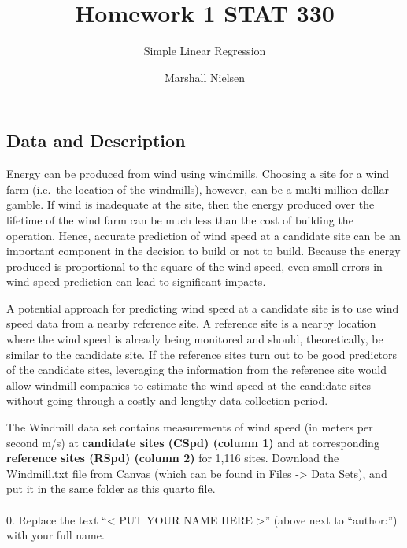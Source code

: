 \documentclass[
  letterpaper,
  DIV=11,
  numbers=noendperiod]{scrartcl}
\title{Homework 1 \textbar{} STAT 330}
\subtitle{Simple Linear Regression}
\author{Marshall Nielsen}
\date{}
\makeatletter
\let\oldparagraph\paragraph
\renewcommand{\paragraph}{
    \@ifstar
      \xxxParagraphStar
      \xxxParagraphNoStar
  }
\newcommand{\xxxParagraphStar}[1]{\oldparagraph*{#1}\mbox{}}
\newcommand{\xxxParagraphNoStar}[1]{\oldparagraph{#1}\mbox{}}
\makeatother
\begin{document}
\maketitle


\subsection{Data and Description}\label{data-and-description}

Energy can be produced from wind using windmills. Choosing a site for a
wind farm (i.e.~the location of the windmills), however, can be a
multi-million dollar gamble. If wind is inadequate at the site, then the
energy produced over the lifetime of the wind farm can be much less than
the cost of building the operation. Hence, accurate prediction of wind
speed at a candidate site can be an important component in the decision
to build or not to build. Because the energy produced is proportional to
the square of the wind speed, even small errors in wind speed prediction
can lead to significant impacts.

A potential approach for predicting wind speed at a candidate site is to
use wind speed data from a nearby reference site. A reference site is a
nearby location where the wind speed is already being monitored and
should, theoretically, be similar to the candidate site. If the
reference sites turn out to be good predictors of the candidate sites,
leveraging the information from the reference site would allow windmill
companies to estimate the wind speed at the candidate sites without
going through a costly and lengthy data collection period.

The Windmill data set contains measurements of wind speed (in meters per
second m/s) at \textbf{candidate sites (CSpd) (column 1)} and at
corresponding \textbf{reference sites (RSpd) (column 2)} for 1,116
sites. Download the Windmill.txt file from Canvas (which can be found in
Files -\textgreater{} Data Sets), and put it in the same folder as this
quarto file.

\paragraph{\texorpdfstring{0. Replace the text ``\textless{} PUT YOUR
NAME HERE \textgreater{}'' (above next to ``author:'') with your full
name.}{0. Replace the text ``\textless{} PUT YOUR NAME HERE \textgreater'' (above next to ``author:'') with your full name.}}\label{replace-the-text-put-your-name-here-above-next-to-author-with-your-full-name.}
\end{document}

